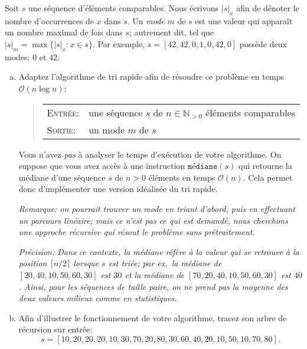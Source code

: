 \documentclass{article}
\newcommand{\N}{\mathbb{N}}                      %
\renewcommand{\O}{\mathcal{O}}                   %
\begin{document}
\vspace*{30pt}

\begin{question}\medskip
  Soit $s$ une séquence d'éléments comparables. Nous écrivons $|s|_x$
  afin de dénoter le nombre d'occurrences de $x$ dans $s$. Un
  \emph{mode} $m$ de $s$ est une valeur qui apparaît un nombre maximal
  de fois dans $s$; autrement dit, tel que $|s|_m = \max\{|s|_x : x
  \in s\}$. Par exemple, $s = [42, 42, 0, 1, 0, 42, 0]$ possède deux
  modes: $0$ et $42$.

  \begin{enumerate}[(a)]
  \setlength\itemsep{20pt}

  \item Adaptez  l'algorithme de tri rapide
    afin de résoudre ce problème en temps $\O(n \log n)$:
    \begin{quote}
      \medskip
      \begin{tabular}{ll}
        \textsc{Entrée}: & une séquence $s$ de $n \in \N_{>0}$
        éléments comparables \\[2pt]
        
        \textsc{Sortie}: & un mode $m$ de $s$
      \end{tabular}
      \medskip
    \end{quote}

    Vous n'avez \emph{pas} à analyser le temps d'exécution de votre
    algorithme. On suppose que vous avez accès à une instruction
    $\texttt{médiane}(s)$ qui retourne la médiane d'une séquence $s$
    de $n > 0$ éléments en temps $\O(n)$. Cela permet donc
    d'implémenter une version idéalisée du tri rapide.\bigskip

    \emph{Remarque: on pourrait trouver un mode en triant d'abord,
      puis en effectuant un parcours linéaire; mais ce n'est pas ce
      qui est demandé, nous cherchons une approche récursive qui
      résout le problème sans prétraitement.}\bigskip

    \emph{Précision: Dans ce contexte, la médiane réfère à la valeur
      qui se retrouve à la position $\lceil n / 2 \rceil$ lorsque $s$
      est triée; par ex.\ la médiane de $[20, 40, 10, 50, 60, 30]$ est
      $30$ et la médiane de $[70, 20, 40, 10, 50, 60, 30]$ est
      $40$. Ainsi, pour les séquences de taille paire, on ne prend
      \emph{pas} la moyenne des deux valeurs milieux comme en
      statistiques.}

  \item Afin  d'illustrer le fonctionnement
    de votre algorithme, tracez son arbre de récursion sur entrée: \[s
    = [10, 20, 20, 20, 10, 30, 70, 20, 80, 30, 60, 40, 20, 10, 50, 10,
      70, 80].\]   
  \end{enumerate}
\end{question}
\end{document}
